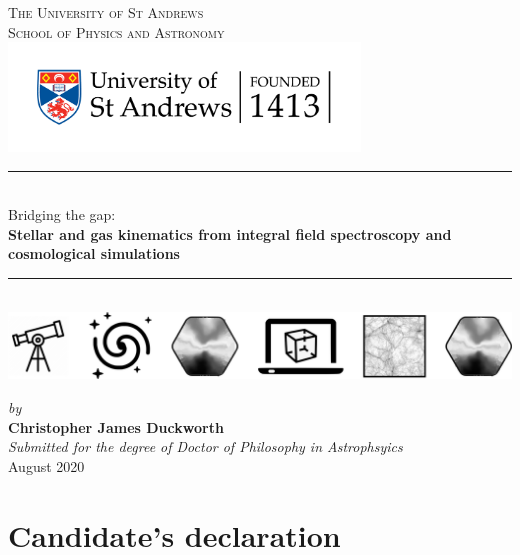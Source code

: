 \documentclass[11pt]{book}
\begin{document}
\pagestyle{empty}

\begin{titlepage}
\newcommand{\HRule}{\rule{\linewidth}{0.5mm}}
\center
\vspace*{0.3cm}
\textsc{\LARGE The University of St Andrews}\\[0.1cm] %
\textsc{\Large School of Physics and Astronomy}\\[3cm] %
\includegraphics[width=0.7\textwidth]{thesis/latex/st_a_logo_.png}

\HRule \\[0.4cm]
{ \LARGE Bridging the gap: \\} 
\textbf{Stellar and gas kinematics from integral field spectroscopy and cosmological simulations} \\[0.4cm] %
\HRule \\[1.6cm]
\vspace{-1.25cm}
\includegraphics[width=\textwidth]{thesis/latex/headers/icons_nobkgd.pdf}

\vspace{0.75cm}
\Large
\textsl{by} \\
\textbf{Christopher James Duckworth}
\\
\vspace*{0.75cm}
\textsl{\Large Submitted for the degree of Doctor of Philosophy in Astrophsyics}\\[0.6cm] %
{\Large {August 2020}}\\[3cm]
\vfill %
 
\end{titlepage}

\frontmatter

\chapter{Candidate's declaration}
\end{document}
